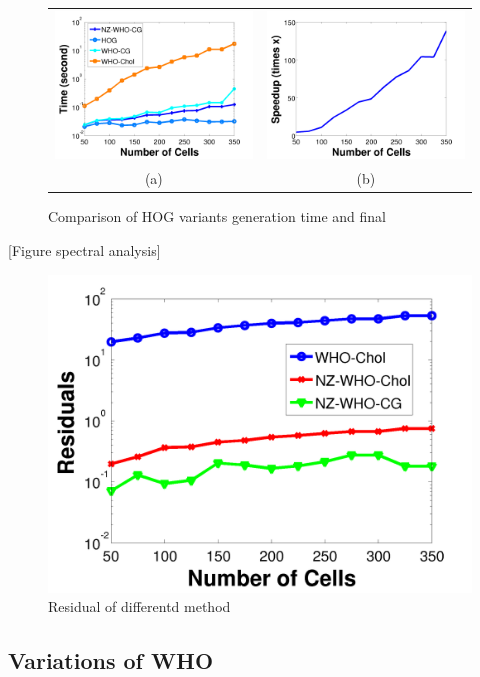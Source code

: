\documentclass[10pt,twocolumn,letterpaper]{article}
\begin{document}
\begin{figure}[t]
  \begin{center}
  \begin{tabular}{cc}
     \includegraphics[width=0.5\linewidth]{whotime} & 
     \includegraphics[width=0.5\linewidth]{speedup}\\
     (a) & (b) \\
 \end{tabular}
  \end{center}
  \caption{Comparison of HOG variants generation time and final }
  \label{fig:whotime}
\end{figure}
[Figure spectral analysis]

\begin{figure}[t]
  \centering
  \includegraphics[width=0.5\linewidth]{residual}
  \caption{Residual of differentd method}
  \label{fig:whotime}
\end{figure}

\subsection{Variations of WHO}
\end{document}
